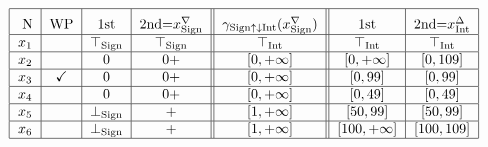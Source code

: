 \begin{example}
\begin{table}[H]
\begin{minipage}{\textwidth}
\[\begin{tabular}{|c|c|c|c||c||c|c|c||}
        \hline 
        \rule{0pt}{14pt} N & WP & 1st & 2nd=\(x^{\nabla}_{\textrm{Sign}}\) & 
        \(\gamma_{\textrm{Sign}\uparrow\downarrow\textrm{Int}}(x^{\nabla}_{\textrm{Sign}})\)& 
        1st & 2nd=\(x^{\Delta}_{\textrm{Int}}\)  \\
        \hline
        $x_1$ &  &  
            $\top_{\textrm{Sign}}$ & $\top_{\textrm{Sign}}$ & 
            $\top_{\textrm{Int}}$ & 
            $\top_{\textrm{Int}}$ & $\top_{\textrm{Int}}$ \\
        \hline
        $x_2$ &  & 
            0 & 0+ & 
            $\left[0, +\infty \right]$ & 
            $\left[0, +\infty \right]$ & $\left[0, 109\right]$ \\
        \hline
        $x_3$ & \checkmark & 
            0 & 0+ & 
            $\left[0, +\infty \right]$ & 
            $\left[0, 99\right]$ & $\left[0, 99\right]$ \\
        \hline
        $x_4$ &  & 
            0 & 0+ & 
            $\left[0, +\infty\right]$ & 
            $\left[0, 49\right]$ & $\left[0, 49\right]$ \\
        \hline
        $x_5$ &  & 
            $\perp_{\textrm{Sign}}$ & + & 
            $\left[1, +\infty \right]$ & 
            $\left[50, 99\right]$ & $\left[50, 99\right]$ \\
        \hline
        $x_6$ &  & 
            $\perp_{\textrm{Sign}}$ & + & 
            $\left[1, +\infty \right]$ & 
            $\left[100, +\infty \right]$ & $\left[100, 109\right]$ \\
        \hline
        \end{tabular}
        \]
    \end{minipage}
    \caption{tabella dei risultati del dominio \(\textrm{Sign}\uparrow\downarrow\textrm{Int}\) divisi per step e fase.}
    \label{fig:risDecSingInt}
\end{table}
\end{example}
